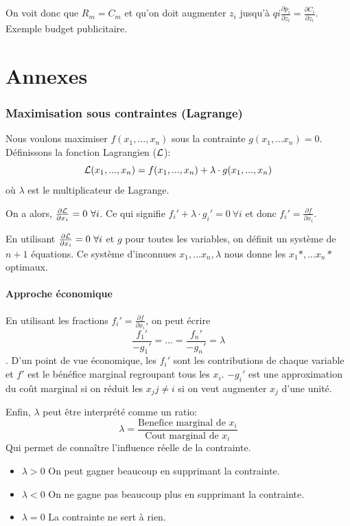 On voit donc que $R_m = C_m$ et qu'on doit augmenter $z_i$ jusqu'à
$qi\frac{\partial p_i}{\partial z_i} = \frac{\partial C_i}{\partial z_i}$.
Exemple budget publicitaire.


\part{Annexes}
\appendix
\section{Maximisation sous contraintes (Lagrange)}
Nous voulons maximiser $f(x_1,..., x_n)$ sous la contrainte $g(x_1,...x_n) = 0$.
Définissons la fonction Lagrangien ($\mathcal{L}$):
$$\mathcal{L}(x_1,..., x_n) = f(x_1,..., x_n) + \lambda\cdot g(x_1,..., x_n)$$
où $\lambda$ est le multiplicateur de Lagrange.

On a alors, $\frac{\partial \mathcal{L}}{\partial x_i} = 0\ \forall i$. Ce qui signifie
$f_i' + \lambda\cdot g_i' = 0\ \forall i$ et donc
$f_i' = \frac{\partial f}{\partial x_i}$.

En utilisant $\frac{\partial \mathcal{L}}{\partial x_i} = 0\ \forall i$ et $g$ pour
toutes les variables, on définit un système de $n+1$ équations. Ce système
d'inconnues $x_1,...x_n, \lambda$ nous donne les $x_1*,...x_n*$ optimaux.

\subsection{Approche économique}
En utilisant les fractions $f_i' = \frac{\partial f}{\partial x_i}$, on peut
écrire $$ \frac{f_1'}{-g_1'} = ... = \frac{f_n'}{-g_n'} = \lambda $$.
D'un point de vue économique, les $f_i'$ sont les contributions de chaque
variable et $f'$ est le bénéfice marginal regroupant tous les $x_i$.
$-g_i'$ est une approximation du coût marginal si on réduit les $x_j j\neq i$
si on veut augmenter $x_j$ d'une unité.

Enfin, $\lambda$ peut être interprété comme un ratio:
$$\lambda = \frac{\textrm{Benefice marginal de }x_i}{\textrm{Cout marginal de }x_i}$$
Qui permet de connaître l'influence réelle de la contrainte.
\begin{itemize}
\item $\lambda > 0$ On peut gagner beaucoup en supprimant la contrainte.
\item $\lambda < 0$ On ne gagne pas beaucoup plus en supprimant la contrainte.
\item $\lambda = 0$ La contrainte ne sert à rien.
\end{itemize}

